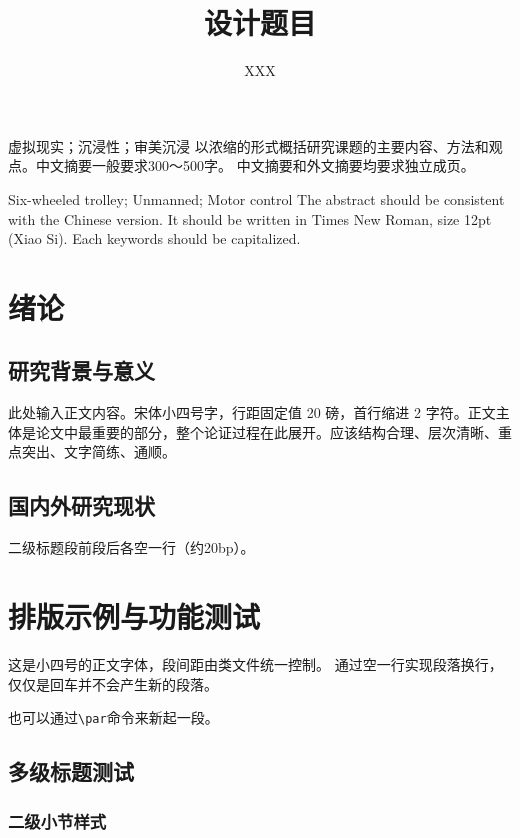 \documentclass{ccu_thesis}
\title{设计题目}
\author{XXX}
\begin{document}
\maketitle

\begin{cnabstract}{虚拟现实；沉浸性；审美沉浸}
以浓缩的形式概括研究课题的主要内容、方法和观点。中文摘要一般要求300～500字。
中文摘要和外文摘要均要求独立成页。
\end{cnabstract}

\begin{enabstract}{Six-wheeled trolley; Unmanned; Motor control}
The abstract should be consistent with the Chinese version. It should be written in Times New Roman, size 12pt (Xiao Si).
Each keywords should be capitalized.
\end{enabstract}

\makecontents


\chapter{绪论}
\section{研究背景与意义}
此处输入正文内容。宋体小四号字，行距固定值 20 磅，首行缩进 2 字符。正文主体是论文中最重要的部分，整个论证过程在此展开。应该结构合理、层次清晰、重点突出、文字简练、通顺。

\section{国内外研究现状}
二级标题段前段后各空一行（约20bp）。

\chapter{排版示例与功能测试}
这是小四号的正文字体，段间距由类文件统一控制。
通过空一行实现段落换行，仅仅是回车并不会产生新的段落。
\par 也可以通过\verb|\par|命令来新起一段。

\section{多级标题测试}
\subsection{二级小节样式}
\end{document}
